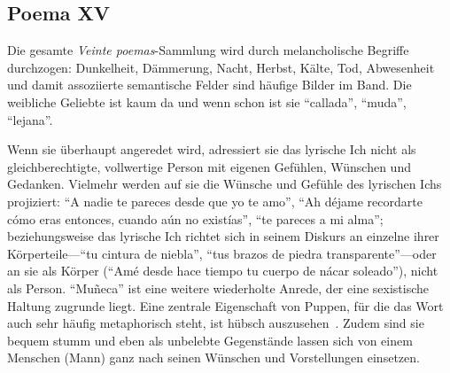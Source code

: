 \subsection{Poema XV}
Die gesamte \textit{Veinte poemas}-Sammlung wird durch melancholische Begriffe durchzogen:
Dunkelheit, Dämmerung, Nacht, Herbst, Kälte, Tod, Abwesenheit und damit assoziierte semantische Felder sind häufige Bilder im Band.
Die weibliche Geliebte ist kaum da und wenn schon ist sie ``callada'', ``muda'', ``lejana''.

Wenn sie überhaupt angeredet wird, adressiert sie das lyrische Ich nicht als gleichberechtigte, vollwertige Person mit eigenen Gefühlen, Wünschen und Gedanken.
Vielmehr werden auf sie die Wünsche und Gefühle des lyrischen Ichs projiziert:
``A nadie te pareces desde que yo te amo'', ``Ah déjame recordarte cómo eras entonces, cuando aún no existías'', ``te pareces a mi alma'';
beziehungsweise das lyrische Ich richtet sich in seinem Diskurs an einzelne ihrer Körperteile—``tu cintura de niebla'', ``tus brazos de piedra transparente''—oder an sie als Körper (``Amé desde hace tiempo tu cuerpo de nácar soleado''), nicht als Person. %
``Muñeca'' ist eine weitere wiederholte Anrede, der eine sexistische Haltung zugrunde liegt.
Eine zentrale Eigenschaft von Puppen, für die das Wort auch sehr häufig metaphorisch steht, ist hübsch auszusehen~\cite{Walter2010}. %
Zudem sind sie bequem stumm und eben als unbelebte Gegenstände lassen sich von einem Menschen (Mann) ganz nach seinen Wünschen und Vorstellungen einsetzen. %

